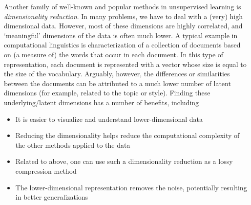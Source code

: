 Another family of well-known and popular methods
in unsupervised learning is \emph{dimensionality reduction}.
In many problems, we have to deal with a (very) high dimensional data.
However, most of these dimensions are highly correlated,
and `meaningful' dimensions of the data is often much lower.
A typical example in computational linguistics is
characterization of a collection of documents
based on (a measure of) the words that occur in each document.
In this type of representation,
each document is represented with a vector
whose size is equal to the size of the vocabulary.
Arguably, however,
the differences or similarities between the documents can be 
attributed to a much lower number of latent dimensions
(for example, related to the topic or style).
Finding these underlying/latent dimensions has a number of benefits,
including
\begin{itemize}
  \item It is easier to visualize and understand lower-dimensional data
  \item Reducing the dimensionality helps reduce
    the computational complexity of the other methods applied to the data
  \item Related to above,
    one can use such a dimensionality reduction as
    a lossy compression method
  \item The lower-dimensional representation removes the noise,
    potentially resulting in better generalizations
\end{itemize}

\begin{marginfigure}[-15\baselineskip]
  \caption{\label{fig:pca-toy-demo}%
    Three data points in $\mathbb{R}^{2}$.
  }
\end{marginfigure}

